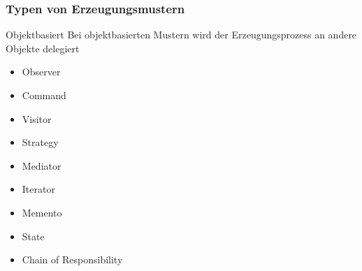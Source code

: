 \begin{frame}
	\frametitle{Typen von Erzeugungsmustern}
	\begin{block}{Objektbasiert}
		Bei objektbasierten Mustern wird der Erzeugungsprozess an andere Objekte delegiert
				\begin{itemize}
					\item \alert<1-> {Observer}
					\item \alert<1-> {Command}
					\item \alert<1-> {Visitor}
					\item Strategy			
					\item Mediator
					\item Iterator
					\item Memento 
					\item State
					\item Chain of Responsibility
				\end{itemize}	
	\end{block}
\end{frame}
